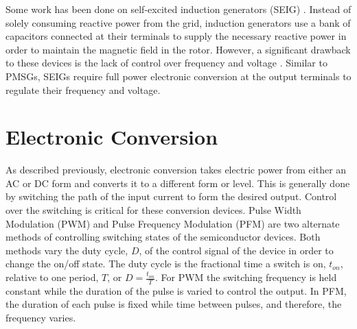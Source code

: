 Some work has been done on self-excited induction generators (SEIG) \cite{Ouazenne1983, Ammasaigounden1986}. Instead of solely consuming reactive power from the grid, induction generators use a bank of capacitors connected at their terminals to supply the necessary reactive power in order to maintain the magnetic field in the rotor. However, a significant drawback to these devices is the lack of control over frequency and voltage \cite{Bansal2005}. Similar to PMSGs, SEIGs require full power electronic conversion at the output terminals to regulate their frequency and voltage.

\section{Electronic Conversion}
As described previously, electronic conversion takes electric power from either an AC or DC form and converts it to a different form or level. This is generally done by switching the path of the input current to form the desired output. Control over the switching is critical for these conversion devices. Pulse Width Modulation (PWM) and Pulse Frequency Modulation (PFM) are two alternate methods of controlling switching states of the semiconductor devices. Both methods vary the duty cycle, $D$, of the control signal of the device in order to change the on/off state. The duty cycle is the fractional time a switch is on, $t_{on}$, relative to one period, $T$, or $D = \frac{t_{on}}{T}$. For PWM the switching frequency is held constant while the duration of the pulse is varied to control the output. In PFM, the duration of each pulse is fixed while time between pulses, and therefore, the frequency varies.


